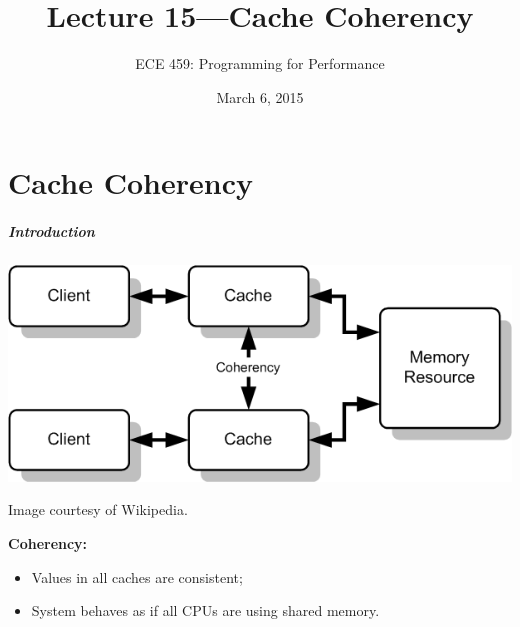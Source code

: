 \documentclass[aspectratio=43]{beamer}
\title{Lecture 15---Cache Coherency}
\subtitle{ECE 459: Programming for Performance}
\date{March 6, 2015}
\newenvironment{changemargin}[1]{%
  \begin{list}{}{%
    \setlength{\topsep}{0pt}%
    \setlength{\leftmargin}{#1}%
    \setlength{\rightmargin}{1em}
    \setlength{\listparindent}{\parindent}%
    \setlength{\itemindent}{\parindent}%
    \setlength{\parsep}{\parskip}%
  }%
  \item[]}{\end{list}}
\begin{document}
\begin{frame}[plain]
  \titlepage
\end{frame}

\part{Cache Coherency}
\frame{\partpage}

\begin{frame}
  \frametitle{Introduction}

  \begin{center}
    \includegraphics[scale=0.7]{L23/coherency}

    Image courtesy of Wikipedia.
  \end{center}

  \begin{changemargin}{1cm}
  {\bf Coherency:}
  \begin{itemize}
    \item Values in all caches are consistent;
    \item System behaves as if all CPUs are using shared memory.
  \end{itemize}
  \end{changemargin}
\end{frame}
\end{document}
